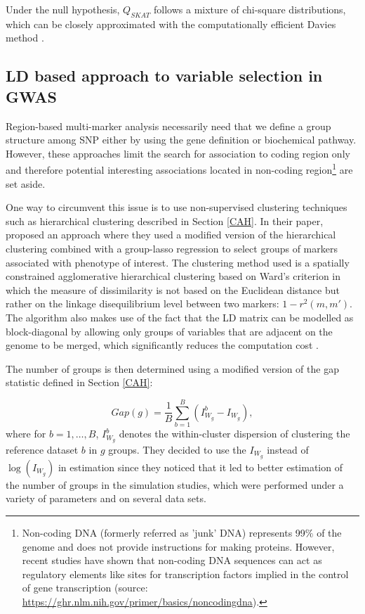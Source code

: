 \documentclass[]{book}
\let\rmarkdownfootnote\footnote%
\def\footnote{\protect\rmarkdownfootnote}
\begin{document}
Under the null hypothesis, \(Q_{SKAT}\) follows a mixture of chi-square
distributions, which can be closely approximated with the
computationally efficient Davies method \citep{davies1980algorithm}.

\hypertarget{adjclust}{%
\subsection{LD based approach to variable selection in GWAS}\label{adjclust}}

Region-based multi-marker analysis necessarily need that we define a
group structure among SNP either by using the gene definition or
biochemical pathway. However, these approaches limit the search for
association to coding region only and therefore potential interesting
associations located in non-coding region\footnote{Non-coding DNA (formerly referred as 'junk' DNA) represents 99\(\%\)
  of the genome and does not provide instructions for making proteins.
  However, recent studies have shown that non-coding DNA sequences can
  act as regulatory elements like sites for transcription factors
  implied in the control of gene transcription (source:
  \url{https://ghr.nlm.nih.gov/primer/basics/noncodingdna}).} are set aside.

One way to circumvent this issue is to use non-supervised clustering
techniques such as hierarchical clustering described in Section
\ref{CAH}. In their paper, \citep{dehman_performance_2015} proposed an
approach where they used a modified version of the hierarchical
clustering combined with a group-lasso regression to select groups of
markers associated with phenotype of interest. The clustering method
used is a spatially constrained agglomerative hierarchical clustering
based on Ward's criterion in which the measure of dissimilarity is not
based on the Euclidean distance but rather on the linkage disequilibrium
level between two markers: \(1 - r^2(m,m')\). The algorithm also makes use
of the fact that the LD matrix can be modelled as block-diagonal by
allowing only groups of variables that are adjacent on the genome to be
merged, which significantly reduces the computation cost \citep[\emph{adjclust},][]{dehman:tel-01288568}.

The number of groups is then determined using a modified version of the
gap statistic defined in Section \ref{CAH}:

\[Gap(g) = \frac{1}{B} \sum_{b=1}^B(I_{W_g}^b - I_{W_g}),\] where for
\(b = 1,\dots,B\), \(I_{W_g}^b\) denotes the within-cluster dispersion of
clustering the reference dataset \(b\) in \(g\) groups. They decided to use
the \(I_{W_g}\) instead of \(\log(I_{W_g})\) in estimation since they
noticed that it led to better estimation of the number of groups in the
simulation studies, which were performed under a variety of parameters
and on several data sets.
\end{document}
